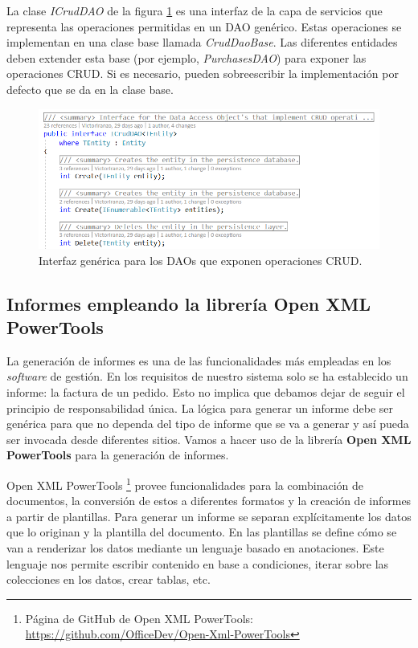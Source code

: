 \documentclass[11pt,spanish,listoffigures]{tfgetsinf}
\begin{document}
La clase \textit{ICrudDAO} de la figura \ref{fig:ICrudDAO} es una interfaz de la capa de servicios que representa las operaciones permitidas en un DAO genérico. Estas operaciones se implementan en una clase base llamada \textit{CrudDaoBase}. Las diferentes entidades deben extender esta base (por ejemplo, \textit{PurchasesDAO}) para exponer las operaciones CRUD. Si es necesario, pueden sobreescribir la implementación por defecto que se da en la clase base.

\begin{figure}[h]
\centering
\includegraphics[scale=0.8]{ICrudDAO}
\caption{Interfaz genérica para los DAOs que exponen operaciones CRUD.}
\label{fig:ICrudDAO}
\end{figure}

\newpage

\subsection{Informes empleando la librería Open XML PowerTools}

La generación de informes es una de las funcionalidades más empleadas en los \textit{software} de gestión. En los requisitos de nuestro sistema solo se ha establecido un informe: la factura de un pedido. Esto no implica que debamos dejar de seguir el principio de responsabilidad única. La lógica para generar un informe debe ser genérica para que no dependa del tipo de informe que se va a generar y así pueda ser invocada desde diferentes sitios. Vamos a hacer uso de la librería \textbf{Open XML PowerTools} para la generación de informes.

Open XML PowerTools \footnote{ Página de GitHub de Open XML PowerTools: \url{https://github.com/OfficeDev/Open-Xml-PowerTools}} provee funcionalidades para la combinación de documentos, la conversión de estos a diferentes formatos y la creación de informes a partir de plantillas. Para generar un informe se separan explícitamente los datos que lo originan y la plantilla del documento. En las plantillas se define cómo se van a renderizar los datos mediante un lenguaje basado en anotaciones. Este lenguaje nos permite escribir contenido en base a condiciones, iterar sobre las colecciones en los datos, crear tablas, etc.
\end{document}
